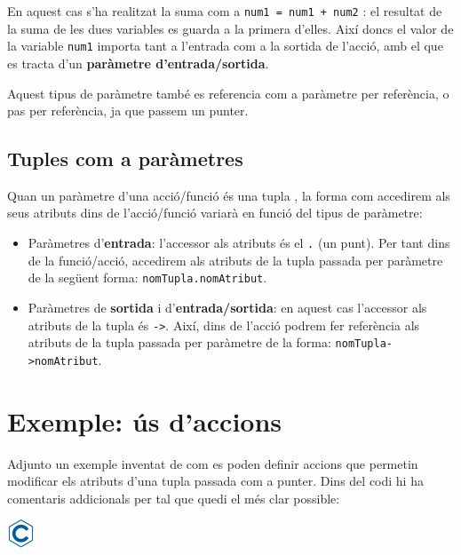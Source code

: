 \documentclass[]{book}
\providecommand{\tightlist}{%
  \setlength{\itemsep}{0pt}\setlength{\parskip}{0pt}}
\begin{document}
En aquest cas s'ha realitzat la suma com a
\texttt{num1\ =\ num1\ +\ num2} : el resultat de la suma de les dues
variables es guarda a la primera d'elles. Així doncs el valor de la
variable \texttt{num1} importa tant a l'entrada com a la sortida de
l'acció, amb el que es tracta d'un \textbf{paràmetre d'entrada/sortida}.

Aquest tipus de paràmetre també es referencia com a paràmetre per
referència, o pas per referència, ja que passem un punter.

\subsection{Tuples com a paràmetres}\label{tuples-com-a-parametres}

Quan un paràmetre d'una acció/funció és una tupla , la forma com
accedirem als seus atributs dins de l'acció/funció variarà en funció del
tipus de paràmetre:

\begin{itemize}
\tightlist
\item
  Paràmetres d'\textbf{entrada}: l'accessor als atributs és el
  \texttt{.} (un punt). Per tant dins de la funció/acció, accedirem als
  atributs de la tupla passada per paràmetre de la següent forma:
  \texttt{nomTupla.nomAtribut}.
\item
  Paràmetres de \textbf{sortida} i d'\textbf{entrada/sortida}: en aquest
  cas l'accessor als atributs de la tupla és \texttt{-\textgreater{}}.
  Així, dins de l'acció podrem fer referència als atributs de la tupla
  passada per paràmetre de la forma:
  \texttt{nomTupla-\textgreater{}nomAtribut}.
\end{itemize}

\section{Exemple: ús d'accions}\label{exemple-us-daccions}

Adjunto un exemple inventat de com es poden definir accions que permetin
modificar els atributs d'una tupla passada com a punter. Dins del codi
hi ha comentaris addicionals per tal que quedi el més clar possible:

\includegraphics{./img/c.png}
\end{document}
